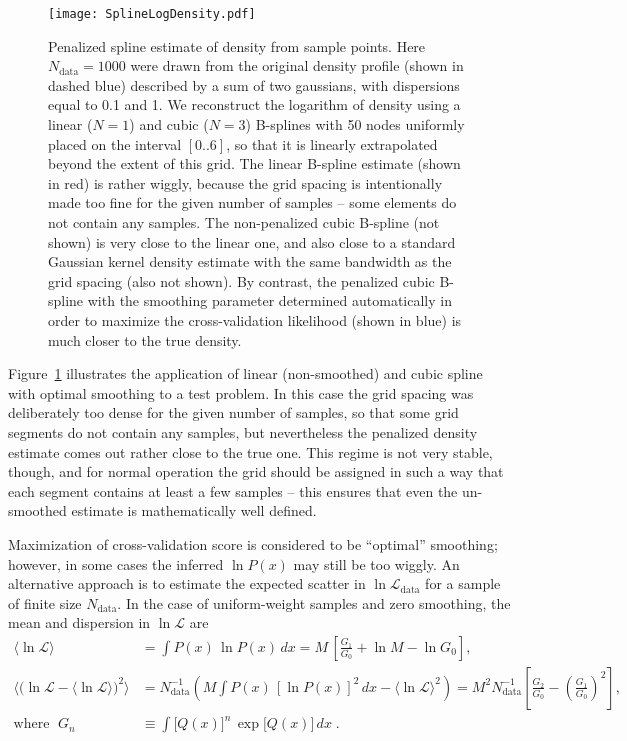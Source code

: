 \documentclass[12pt]{article}
\begin{document}
\begin{figure}[t]
\begin{center}
\texttt{[image: SplineLogDensity.pdf]}
\end{center}
\caption{Penalized spline estimate of density from sample points. Here $N_\mathrm{data}=1000$ were drawn from the original density profile (shown in dashed blue) described by a sum of two gaussians, with dispersions equal to 0.1 and 1. We reconstruct the logarithm of density using a linear ($N=1$) and cubic ($N=3$) B-splines with 50 nodes uniformly placed on the interval $[0..6]$, so that it is linearly extrapolated beyond the extent of this grid. The linear B-spline estimate (shown in red) is rather wiggly, because the grid spacing is intentionally made too fine for the given number of samples -- some elements do not contain any samples. The non-penalized cubic B-spline (not shown) is very close to the linear one, and also close to a standard Gaussian kernel density estimate with the same bandwidth as the grid spacing (also not shown). By contrast, the penalized cubic B-spline with the smoothing parameter determined automatically in order to maximize the cross-validation likelihood (shown in blue) is much closer to the true density.
} \label{fig:SplineLogDensity}
\end{figure}

Figure~\ref{fig:SplineLogDensity} illustrates the application of linear (non-smoothed) and cubic spline with optimal smoothing to a test problem. In this case the grid spacing was deliberately too dense for the given number of samples, so that some grid segments do not contain any samples, but nevertheless the penalized density estimate comes out rather close to the true one.
This regime is not very stable, though, and for normal operation the grid should be assigned in such a way that each segment contains at least a few samples -- this ensures that even the un-smoothed estimate is mathematically well defined.

Maximization of cross-validation score is considered to be ``optimal'' smoothing; however, in some cases the inferred $\ln P(x)$ may still be too wiggly. An alternative approach is to estimate the expected scatter in $\ln\mathcal{L}_\mathrm{data}$ for a sample of finite size $N_\mathrm{data}$. In the case of uniform-weight samples and zero smoothing, the mean and dispersion in $\ln\mathcal{L}$ are
\begin{align}
\big\langle\ln\mathcal{L}\big\rangle &=
  \int P(x)\,\ln P(x)\, dx = M\,\left[\frac{G_1}{G_0} + \ln M - \ln G_0\right] ,\\
\Big\langle\big(\ln\mathcal{L}-\langle\ln\mathcal{L}\rangle\big)^2\Big\rangle &=
  N_\mathrm{data}^{-1} \left( M\!\int\! P(x)\,[\ln P(x)]^2\, dx - \big\langle\ln\mathcal{L}\big\rangle^2 \right) =
  M^2 N_\mathrm{data}^{-1} \left[\frac{G_2}{G_0} - \left(\frac{G_1}{G_0}\right)^{\!2}\right]\! , \nonumber\\
\mbox{where }\; G_n &\equiv \int \big[Q(x)\big]^n\, \exp\big[Q(x)\big]\,dx\;.  \nonumber
\end{align}
\end{document}
